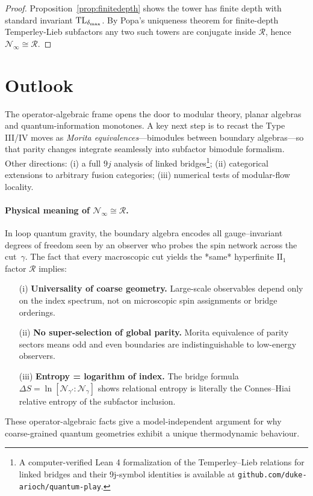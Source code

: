 \documentclass[11pt]{article}
\begin{document}
\begin{proof}
Proposition~\ref{prop:finitedepth} shows the tower has finite depth with
standard invariant ${\rm TL}_{\delta_{\max}}$.
By Popa's uniqueness theorem for finite-depth Temperley-Lieb
subfactors \cite{PopaCBMS} any two such towers are conjugate inside
$\mathcal R$, hence $\mathcal N_{\infty}\cong\mathcal R$.
\end{proof}

\section{Outlook}
The operator-algebraic frame opens the door to modular theory, planar
algebras and quantum-information monotones.  A key next step is to recast the
Type III/IV moves as \emph{Morita equivalences}—bimodules between boundary
algebras—so that parity changes integrate seamlessly into subfactor bimodule
formalism.  Other directions: (i) a full $9j$ analysis of linked bridges\footnote{A computer-verified Lean 4 formalization of the Temperley–Lieb relations for linked bridges and their 9j-symbol identities is available at \texttt{github.com/duke-arioch/quantum-play}.}; (ii)
categorical extensions to arbitrary fusion categories; (iii) numerical tests of
modular-flow locality.

\paragraph{Physical meaning of $\mathcal N_{\infty}\cong\mathcal R$.}
In loop quantum gravity, the boundary algebra encodes all gauge–invariant
degrees of freedom seen by an observer who probes the spin network across the
cut~$\gamma$.  
The fact that every macroscopic cut yields the *same* hyperfinite
$\mathrm{II}_1$ factor $\mathcal R$ implies:

\begin{enumerate}
\item[(i)] \textbf{Universality of coarse geometry.}  
      Large-scale observables depend only on the index spectrum, not on
      microscopic spin assignments or bridge orderings.
\item[(ii)] \textbf{No super-selection of global parity.}  
      Morita equivalence of parity sectors means odd and even boundaries are
      indistinguishable to low-energy observers.
\item[(iii)] \textbf{Entropy = logarithm of index.}  
      The bridge formula $\Delta S=\ln[\mathcal N_{\gamma'}:\mathcal N_{\gamma}]$
      shows relational entropy is literally the Connes–Hiai relative entropy
      of the subfactor inclusion.
\end{enumerate}
These operator-algebraic facts give a model-independent argument for why
coarse-grained quantum geometries exhibit a unique thermodynamic behaviour.
\end{document}
